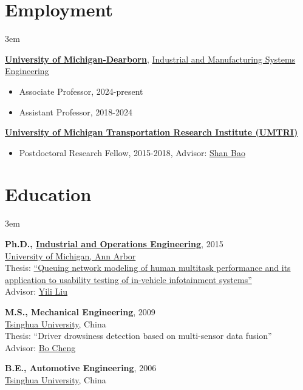 \documentclass[11pt]{article}
\newenvironment{main}
{\begin{adjustwidth}{3em}{}}
{\end{adjustwidth}}
\begin{document}
\section*{Employment}
\begin{main}

\href{https://umdearborn.edu/}{\textbf{University of Michigan-Dearborn}},
\href{https://umdearborn.edu/cecs/departments/industrial-and-manufacturing-systems-engineering}{Industrial and Manufacturing Systems Engineering}

\begin{itemize}
    \item Associate Professor, 2024-present
    \item Assistant Professor, 2018-2024
\end{itemize}

\href{http://www.umtri.umich.edu/}{\textbf{University of Michigan Transportation Research Institute (UMTRI)}}

\begin{itemize}
    \item Postdoctoral Research Fellow, 2015-2018, Advisor: \href{https://sites.google.com/umich.edu/hfet-lab/people}{Shan Bao}
\end{itemize}


\end{main}
\section*{Education}
\begin{main}

\textbf{Ph.D., \href{https://ioe.engin.umich.edu/}{Industrial and Operations Engineering}}, 2015\\
\href{https://umich.edu/}{University of Michigan, Ann Arbor}\\
Thesis: \href{https://deepblue.lib.umich.edu/handle/2027.42/113590}{``Queuing network modeling of human multitask performance and its application to usability testing of in-vehicle infotainment systems''}\\
Advisor: \href{https://ioe.engin.umich.edu/people/yili-liu/}{Yili Liu}

\textbf{M.S., Mechanical Engineering}, 2009\\
\href{https://www.tsinghua.edu.cn/en/index.htm}{Tsinghua University}, China\\
Thesis: ``Driver drowsiness detection based on multi-sensor data fusion''\\
Advisor: \href{http://www.svm.tsinghua.edu.cn/essay/80/1799.html}{Bo Cheng}

\textbf{B.E., Automotive Engineering}, 2006\\
\href{https://www.tsinghua.edu.cn/en/index.htm}{Tsinghua University}, China


\end{main}
\end{document}
